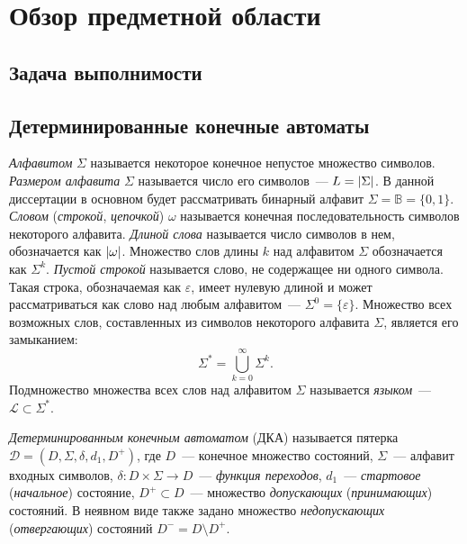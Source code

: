 
\chapter{Обзор предметной области} 
\label{sec:review}

\section{Задача выполнимости}
\label{sec:review:sat}

\section{Детерминированные конечные автоматы} 
\label{sec:review:dfa-def}

\emph{Алфавитом} $\Sigma$ называется некоторое конечное непустое множество символов.
\emph{Размером алфавита} $\Sigma$ называется число его символов~{---} $L = \lvert\Sigma\rvert$.
В данной диссертации в основном будет рассматривать бинарный алфавит $\Sigma = \mathbb{B} = \{0, 1\}$.
\emph{Словом} (\emph{строкой}, \emph{цепочкой}) $\omega$ называется конечная последовательность символов некоторого алфавита. 
\emph{Длиной слова} называется число символов в нем, обозначается как $\lvert\omega\rvert$.
Множество слов длины $k$ над алфавитом $\Sigma$ обозначается как $\Sigma^{k}$.
\emph{Пустой строкой} называется слово, не содержащее ни одного символа.
Такая строка, обозначаемая как $\varepsilon$, имеет нулевую длиной и может рассматриваться как слово над любым алфавитом~{---} $\Sigma^{0}=\{\varepsilon\}$.
Множество всех возможных слов, составленных из символов некоторого алфавита $\Sigma$, является его замыканием:
$$\Sigma^{*} = \bigcup_{k=0}^{\infty}\Sigma^{k}.$$
Подмножество множества всех слов над алфавитом $\Sigma$ называется \emph{языком}~--- $\mathcal{L} \subset \Sigma^{*}$.

\emph{Детерминированным конечным автоматом} (ДКА) называется пятерка $\mathcal{D} = \left(D,\Sigma,\delta,d_{1},D^{+}\right)$, где $D$~{---} конечное множество состояний, $\Sigma$~{---} алфавит входных символов, $\delta:D \times \Sigma \rightarrow D$~{---} \emph{функция переходов}, $d_{1}$~{---} \emph{стартовое} (\emph{начальное}) состояние, $D^{+} \subset D$~{---} множество \emph{допускающих} (\emph{принимающих}) состояний. 
В неявном виде также задано множество \emph{недопускающих} (\emph{отвергающих}) состояний $D^{-} = D \setminus D^{+}$.

